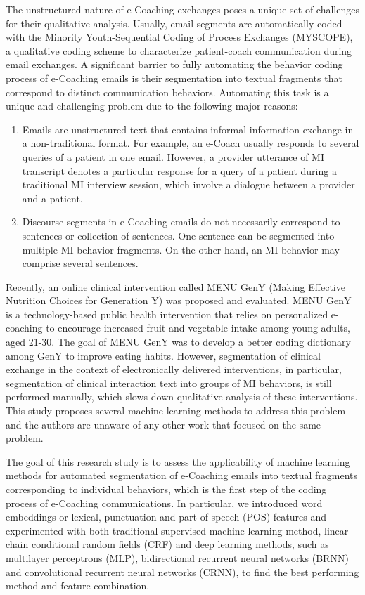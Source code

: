 \documentclass{amia}
\begin{document}
The unstructured nature of e-Coaching exchanges poses a unique set of challenges for their qualitative analysis. Usually, email segments are automatically coded with the Minority Youth-Sequential Coding of Process Exchanges (MYSCOPE), \cite{carcone2013provider} a qualitative coding scheme to characterize patient-coach communication during email exchanges. A significant barrier to fully automating the behavior coding process of e-Coaching emails is their segmentation into textual fragments that correspond to distinct communication behaviors. Automating this task is a unique and challenging problem due to the following major reasons:

\begin{enumerate}
\item Emails are unstructured text that contains informal information exchange in a non-traditional format. For example, an e-Coach usually responds to several queries of a patient in one email. However, a provider utterance of MI transcript denotes a particular response for a query of a patient during a traditional MI interview session, which involve a dialogue between a provider and a patient. 
\item Discourse segments in e-Coaching emails do not necessarily correspond to sentences or collection of sentences. One sentence can be segmented into multiple MI behavior fragments. On the other hand, an MI behavior may comprise several sentences.
\end{enumerate}

Recently, an online clinical intervention called MENU GenY (Making Effective Nutrition Choices for Generation Y) was proposed and evaluated. \cite{alexander2017motivations} MENU GenY is a technology-based public health intervention that relies on personalized e-coaching to encourage increased fruit and vegetable intake among young adults, aged 21-30. The goal of MENU GenY was to develop a better coding dictionary among GenY to improve eating habits. However, segmentation of clinical exchange in the context of electronically delivered interventions, in particular, segmentation of clinical interaction text into groups of MI behaviors, is still performed manually, which slows down qualitative analysis of these interventions. This study proposes several machine learning methods to address this problem and the authors are unaware of any other work that focused on the same problem.

The goal of this research study is to assess the applicability of machine learning methods for automated segmentation of e-Coaching emails into textual fragments corresponding to individual behaviors, which is the first step of the coding process of e-Coaching communications. In particular, we introduced word embeddings or lexical, punctuation and  part-of-speech (POS) features and experimented with both traditional supervised machine learning method, linear-chain conditional random fields (CRF)\cite{lafferty2001conditional} and deep learning methods, such as multilayer perceptrons (MLP),\cite{rumelhart1986learning} bidirectional recurrent neural networks (BRNN)\cite{schuster1997bidirectional} and convolutional recurrent neural networks (CRNN),\cite{treviso2017sentence} to find the best performing method and feature combination. 
\end{document}
